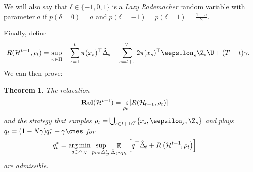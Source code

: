 \documentclass{article}
\newcommand{\exop}{\mathop{\ex}}
\newcommand{\rel}{\mathbf{Rel}}
\newcommand{\hist}{{\mathcal H}}
\newtheorem{theorem}{Theorem}
\begin{document}
We will also say that $\delta\in \{ -1,0,1\}$ is a \emph{Lazy Rademacher} random variable with parameter $a$ if $p(\delta=0) = a$ and $p(\delta = -1) = p(\delta = 1) = \frac{1-a}{2}$. 

Finally, define
\[
  R(\hist^{t-1},\rho_t) =
        \sup_{\pi\in\Pi}
      -
      \sum_{s=1}^{t} \pi(x_s)^\top \hat\Delta_s
      -
      \sum_{s=t+1}^{T} 2 \pi(x_s)^\top \eepsilon_{s}\Z_s \U
      + (T-t)\gamma.
  \]
We can then prove:
\begin{theorem}\label{thm:admissibility_new}  
  The relaxation
  \begin{align}
    \rel(\hist^{t-1})
    &= \exop_{
      \rho_t}
      \left[
      R(\hist_{t-1},\rho_t)
      \right]
      \label{eqn:relaxation.def}
  \end{align}
  and the strategy that samples $\rho_t = \bigcup_{s \in t+1:T} \{x_{s},\eepsilon_{s},\Z_{s}\}$ and plays  $q_t= (1-N\gamma)q_t^* + \gamma \ones$ for
\begin{align}
  q_t^*
  &=
  \argmin_{q \in \triangle_{N}}
  \sup_{p_t \in \triangle_{\mathcal D}'} 
    \exop_{\hat\Delta_t \sim p_t}\left[
    q^\top\hat\Delta_t
    +   R\left(\hist^{t-1},\rho_t\right)\right]
  \label{eqn:strategy.def}
\end{align}
are admissible.
\end{theorem}
\end{document}
